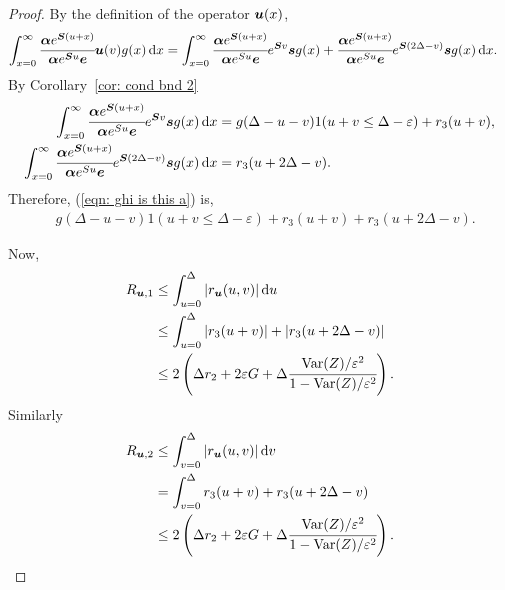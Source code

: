 \begin{proof}
	By the definition of the operator \({\boldsymbol u}(x)\), 
	\begin{align}
		\int_{x=0}^\infty \cfrac{\boldsymbol \alpha  e^{\boldsymbol{S} (u+x)} }{\boldsymbol \alpha  e^{\boldsymbol{S} u} \boldsymbol e} {\boldsymbol u}(v)g(x)\, \mathrm{d} x 		
		&=
			\displaystyle\int_{x=0}^\infty 
				\cfrac{
					\boldsymbol \alpha e^{\boldsymbol S(u+x)}
					}{
					\boldsymbol \alpha e^{Su}\boldsymbol e
					} 
				e^{\boldsymbol{S}v}\boldsymbol s g(x)
				+
				\cfrac{
					\boldsymbol \alpha e^{\boldsymbol S(u+x)}
					}{
					\boldsymbol \alpha e^{Su}\boldsymbol e
					} 
				e^{\boldsymbol{S}(2\Delta-v)}\boldsymbol sg(x) \, \mathrm{d} x. \label{eqn: ghi is this a}
	\end{align}
	By Corollary~\ref{cor: cond bnd 2} 
	\begin{align}
		\int_{x=0}^\infty 
				\cfrac{
					\boldsymbol \alpha e^{\boldsymbol S(u+x)}
					}{
					\boldsymbol \alpha e^{Su}\boldsymbol e
					} 
				e^{\boldsymbol{S}v}\boldsymbol s g(x)\, \mathrm{d} x 
				&= g(\Delta-u-v) 1(u+v\leq\Delta-\varepsilon) + r_3 (u+v), \label{eqn: dkskkk2}
		\\
		\int_{x=0}^\infty\cfrac{
					\boldsymbol \alpha e^{\boldsymbol S(u+x)}
					}{
					\boldsymbol \alpha e^{Su}\boldsymbol e
					} 
				e^{\boldsymbol{S}(2\Delta-v)}\boldsymbol sg(x) \, \mathrm{d} x 
				&= r_3 (u+2\Delta - v).
	\end{align}
	Therefore, (\ref{eqn: ghi is this a}) is, 
	\begin{align}
		&g(\Delta-u-v) 1(u+v\leq\Delta-\varepsilon) + r_3 (u+v) + r_3 (u+2\Delta - v).
	\end{align}	
	
	Now,
	\begin{align*}
		R_{{{\boldsymbol u}},1}&\leq \int_{u=0}^{\Delta}| r_{{\boldsymbol u}}(u,v)|\, \mathrm{d} u
		\\& \leq \int_{u=0}^{\Delta} |r_3 (u+v)| + |r_3 (u+2\Delta - v) |
		\\&\leq 2\left(\Delta r_2 + 2\varepsilon G + \Delta\cfrac{\mathrm{Var}(Z)/\varepsilon^2}{1-\mathrm{Var}(Z)/\varepsilon^2}\right).
	\end{align*}
	Similarly 
	\begin{align*}
		R_{{{\boldsymbol u}},2}&\leq \int_{v=0}^{\Delta}| r_{{\boldsymbol u}}(u,v)|\, \mathrm{d} v
		\\&= \int_{v=0}^{\Delta} r_3(u+v) + r_3(u+2\Delta-v) 
		\\& \leq 2\left(\Delta r_2 + 2\varepsilon G + \Delta\cfrac{\mathrm{Var}(Z)/\varepsilon^2}{1-\mathrm{Var}(Z)/\varepsilon^2}\right).
	\end{align*}
\end{proof}


